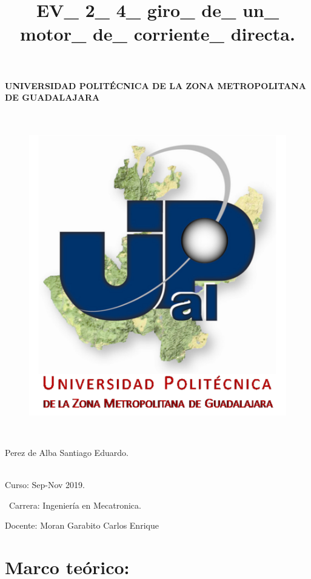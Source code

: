 \documentclass[12pt,letterpaper]{article}
\title{EV\_ 2\_ 4\_ giro\_ de\_ un\_ motor\_ de\_ corriente\_ directa.}
\begin{document}
\maketitle




\paragraph{ UNIVERSIDAD POLITÉCNICA DE LA ZONA METROPOLITANA DE GUADALAJARA}

\
\begin{figure}[h!]
\begin{center}

\includegraphics[scale=0.8]{Upzmg.png} 
\label{Upzmg}


\end{center}
\end{figure}


\

\large{Perez de Alba Santiago Eduardo.\\
\

Curso: Sep-Nov 2019.

\
Carrera: Ingeniería en Mecatronica.\

Docente: Moran Garabito Carlos Enrique}

\newpage

\section{Marco teórico:}
\
\end{document}
